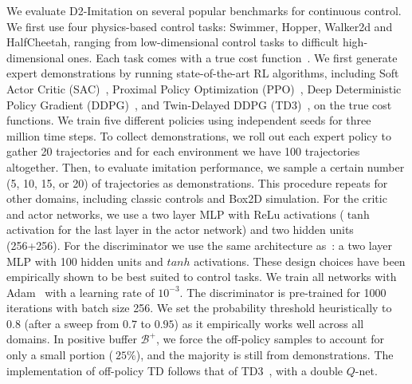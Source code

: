 \documentclass[letterpaper]{article} %
\begin{document}
We evaluate D2-Imitation on several popular benchmarks for continuous control. 
We first use four physics-based control tasks: Swimmer, Hopper, Walker2d and HalfCheetah,
ranging from low-dimensional control tasks to difficult high-dimensional ones. 
Each task comes with a true cost function~\cite{brockman2016openai}. 
We first generate expert demonstrations by running state-of-the-art RL algorithms, 
including Soft Actor Critic (SAC)~\cite{haarnoja2018soft}, 
Proximal Policy Optimization (PPO)~\cite{schulman2017proximal}, 
Deep Deterministic Policy Gradient (DDPG)~\cite{lillicrap2015continuous}, 
and Twin-Delayed DDPG (TD3)~\cite{fujimoto2018addressing}, 
on the true cost functions. 
We train five different policies using independent seeds for three million time steps. 
To collect demonstrations, 
we roll out each expert policy to gather 20 trajectories
and for each environment we have 100 trajectories altogether. 
Then, to evaluate imitation performance, 
we sample a certain number (5, 10, 15, or 20) of trajectories as demonstrations.
This procedure repeats for other domains, including classic controls and Box2D simulation. 
For the critic and actor networks, 
we use a two layer MLP with ReLu activations ($\tanh$ activation for the last layer in the actor network) and two hidden units (256+256). 
For the discriminator we use the same architecture as~\citet{ho2016generative}: 
a two layer MLP with 100 hidden units and $tanh$ activations. 
These design choices have been empirically shown to be best suited to control tasks. 
We train all networks with Adam~\cite{kingma2014adam} with a learning rate of $10^{-3}$. 
The discriminator is pre-trained for 1000 iterations with batch size 256. 
We set the probability threshold heuristically to $0.8$ (after a sweep from $0.7$ to $0.95$) as it empirically works well across all domains. 
In positive buffer $\mathcal{B}^+$, we force the off-policy samples to account for only a small portion ($~25\%$), 
and the majority is still from demonstrations. 
The implementation of off-policy TD follows that of TD3~\cite{fujimoto2018addressing}, with a double $Q$-net.
\end{document}
